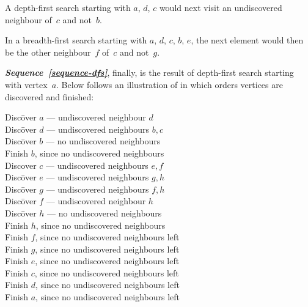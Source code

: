 \documentclass{jn-pset}
\begin{document}
\begin{problem}
\begin{solution}
\begin{compactitem}
  \item
    A depth-first search starting with $a$, $d$, $c$
    would next visit an undiscovered neighbour of~$c$ and not~$b$.

  \item
    In a breadth-first search starting with
    $a$, $d$, $c$, $b$, $e$,
    the next element would then be the other neighbour~$f$ of~$c$
    and not~$g$.
    
  \end{compactitem}

  \medskip

  \textit{\textbf{Sequence~\ref{sequence-dfs}}},
  finally,
  is the result of depth-first
  search starting with vertex~$a$.
  Below follows an illustration of in which orders vertices are
  discovered and finished: \\
  \vspace{-6.0mm}
  \begin{tabbing}
    Disco\={}ver  $a$ --- undiscovered neighbour $d$
    \\
    \> Disco\={}ver  $d$ --- undiscovered neighbours $b, c$
    \\
    \> \> Disco\={}ver  $b$  --- no undiscovered neighbours
    \\
    \> \> Finish $b$, since no undiscovered neighbours
    \\
    \> \> Discover $c$  --- undiscovered neighbours $e, f$
    \\
    \> \> \> Disco\={}ver  $e$  --- undiscovered neighbours $g, h$
    \\
    \> \> \> \> Disco\={}ver  $g$  --- undiscovered neighbours $f, h$
    \\
    \> \> \> \> \> Disco\={}ver  $f$ --- undiscovered neighbour $h$
    \\
    \> \> \> \> \> \> Disco\={}ver $h$   --- no undiscovered neighbours
    \\
    \> \> \> \> \> \> Finish $h$, since no undiscovered neighbours
    \\
    \> \> \> \> \> Finish $f$, since no undiscovered neighbours left
    \\
    \> \> \> \> Finish $g$, since no undiscovered neighbours left
    \\
    \> \> \> Finish $e$, since no undiscovered neighbours left
    \\
    \> \> Finish $c$, since no undiscovered neighbours left
    \\
    \> Finish $d$, since no undiscovered neighbours left
    \\
    Finish $a$, since no undiscovered neighbours left
  \end{tabbing}
  
  
  
\end{solution}

%         

  
\end{problem}
\end{document}
